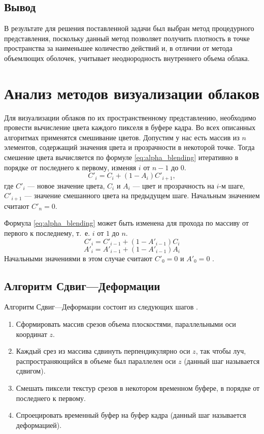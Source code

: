 \subsection*{Вывод}
В результате для решения поставленной задачи был выбран метод процедурного представления, поскольку данный метод позволяет получить плотность в точке пространства за наименьшее количество действий и, в отличии от метода объемлющих оболочек, учитывает неоднородность внутреннего объема облака.


\section{Анализ методов визуализации облаков}

Для визуализации облаков по их пространственному представлению, необходимо провести вычисление цвета каждого пикселя в буфере кадра. Во всех описанных алгоритмах применятся смешивание цветов. Допустим у нас есть массив из $n$ элементов, содержащий значения цвета и прозрачности в некоторой точке. Тогда смешение цвета вычисляется по формуле \eqref{eq:alpha_blending} итеративно в порядке от последнего к первому, изменяя $i$ от $n-1$ до $0$.
\begin{equation}
	\label{eq:alpha_blending}
	C'_i = C_i + (1 - A_i)C'_{i+1},
\end{equation}
где $C'_i$ --- новое значение цвета, $C_i$ и $A_i$ --- цвет и прозрачность на $i$-м шаге, $C'_{i+1}$ --- значение смешанного цвета на предыдущем шаге. Начальным значением считают $C'_n = 0$.

Формула \eqref{eq:alpha_blending} может быть изменена для прохода по массиву от первого к последнему, т.~е. $i$ от $1$ до $n$.
\begin{equation}
	\label{eq:color_blending_for}
	C'_i = C'_{i - 1} + (1 - A'_{i - 1})C_{i}
\end{equation}
\begin{equation}
	\label{eq:alpha_blending_for}
	A'_i = A'_{i - 1} + (1 - A'_{i - 1})A_{i}
\end{equation}
Начальными значениями в этом случае считают $C'_0 = 0$ и $A'_0=0$ \cite{rtvg}.


\subsection{Алгоритм Сдвиг---Деформации}
\label{slice}

Алгоритм Сдвиг---Деформации состоит из следующих шагов \cite{shearwarp}.

\begin{enumerate}
	\item Сформировать массив срезов объема плоскостями, параллельными оси координат $z$.
	\item Каждый срез из массива сдвинуть перпендикулярно оси $z$, так чтобы луч, распространяющийся в объеме был параллелен оси $z$ (данный шаг называется сдвигом). 
	\item Смешать пиксели текстур срезов в некотором временном буфере, в порядке от последнего к первому.
	\item Спроецировать временный буфер на буфер кадра (данный шаг называется деформацией).
\end{enumerate}

